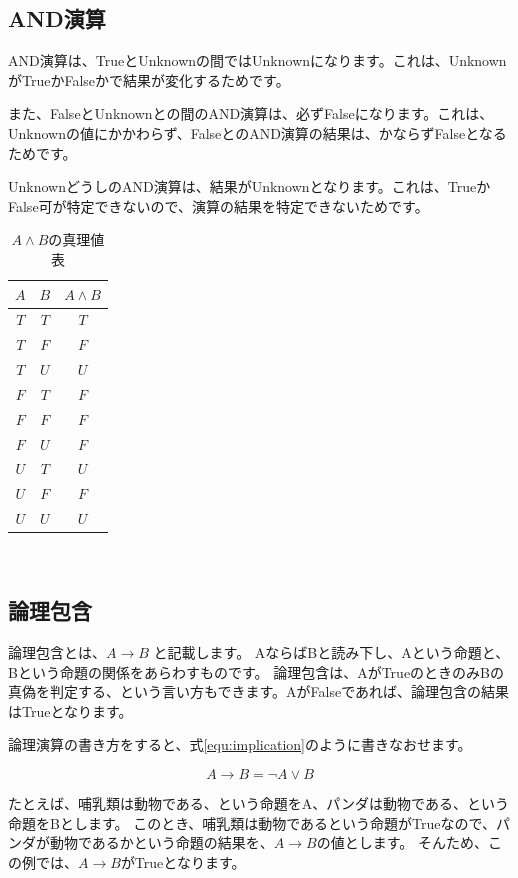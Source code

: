 \subsection{AND演算}

AND演算は、TrueとUnknownの間ではUnknownになります。これは、UnknownがTrueかFalseかで結果が変化するためです。

また、FalseとUnknownとの間のAND演算は、必ずFalseになります。これは、Unknownの値にかかわらず、FalseとのAND演算の結果は、かならずFalseとなるためです。

UnknownどうしのAND演算は、結果がUnknownとなります。これは、TrueかFalse可が特定できないので、演算の結果を特定できないためです。

\begin{table}[htb]
  \begin{tabular}{|c|c|c|} \hline
    $A$ & $B$ & $A \land B$ \\ \hline
    $T$ & $T$ & $T$ \\
    $T$ & $F$ & $F$ \\
    $T$ & $U$ & $U$ \\
    $F$ & $T$ & $F$ \\
    $F$ & $F$ & $F$ \\
    $F$ & $U$ & $F$ \\
    $U$ & $T$ & $U$ \\
    $U$ & $F$ & $F$ \\
    $U$ & $U$ & $U$\\ \hline
  \end{tabular}
　　\label{chart:and}
　　\caption{$A \land B$の真理値表}
\end{table}


\subsection{論理包含}

論理包含とは、$A \to B$ と記載します。
AならばBと読み下し、Aという命題と、Bという命題の関係をあらわすものです。
論理包含は、AがTrueのときのみBの真偽を判定する、という言い方もできます。AがFalseであれば、論理包含の結果はTrueとなります。

論理演算の書き方をすると、式\ref{equ:implication}のように書きなおせます。

\begin{equation}
\label{equ:implication}
A \to B = \lnot A \lor B
\end{equation}

たとえば、哺乳類は動物である、という命題をA、パンダは動物である、という命題をBとします。
このとき、哺乳類は動物であるという命題がTrueなので、パンダが動物であるかという命題の結果を、$A \to B$の値とします。
そんため、この例では、$A \to B$がTrueとなります。

